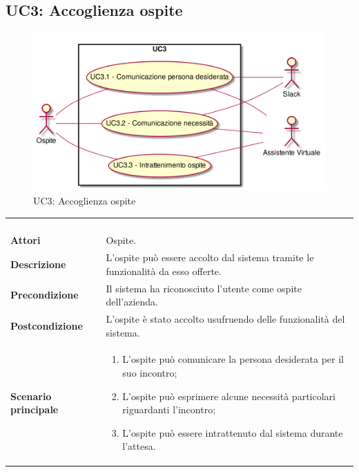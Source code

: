 \newpage\subsection{UC3: Accoglienza ospite}
\label{UC3}
\begin{figure}[h]
	\centering
	\includegraphics[width=\textwidth,height=\textheight,keepaspectratio]{images/UseCaseUC3.png}
	\caption{UC3: Accoglienza ospite}
\end{figure}
\begin{longtable}{l|p{10cm}}
	\rowcolor[gray]{0.8} \multicolumn{2}{c}{} \\
	\rowcolor[gray]{0.8} \multicolumn{2}{c}{\textbf{UC3 - Accoglienza ospite}} \\
	\rowcolor[gray]{0.8} \multicolumn{2}{c}{} \\
	\hline
	&\\
	\textbf{Attori} & Ospite.\\[7pt]
	\textbf{Descrizione} & L'ospite può essere accolto dal sistema tramite le funzionalità da esso offerte.\\[7pt]
	\textbf{Precondizione} & Il sistema ha riconosciuto l'utente come ospite dell'azienda.\\[7pt]
	\textbf{Postcondizione} & L'ospite è stato accolto usufruendo delle funzionalità del sistema.\\[7pt]
	\textbf{Scenario principale} &\begin{enumerate}
		\item  L'ospite può comunicare la persona desiderata per il suo incontro;
		\item  L'ospite può esprimere alcune necessità  particolari riguardanti l'incontro;
		\item  L'ospite può essere intrattenuto dal sistema durante l'attesa.
	\end{enumerate}
	\\[7pt]\hline
\end{longtable}

